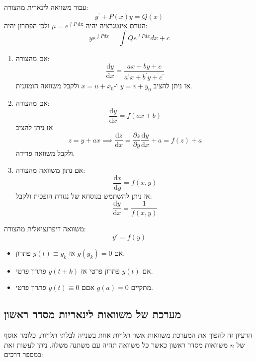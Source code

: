 \documentclass{tstextbook}
\begin{document}
\begin{proposition}
עבור משוואה לינארית מהצורה:
$$y^{\prime}+P(x)y=Q(x)$$
הגורם אינטגרציה יהיה \(\mu=e^{ \int P\;\mathrm{dx} }\) ולכן הפתרון יהיה:
$$y e^{\int P d x}=\int Q e^{\int P d x}d x+c$$

\end{proposition}
\begin{proposition}
  \begin{enumerate}
    \item אם מהצורה: 
$$\frac{\mathrm{d} y}{\mathrm{d} x} ={\frac{a x+b y+c}{a^{\prime}x+b^{\prime}y+c^{\prime}}}$$
אז ניתן להציב \(y=v+y_{0}\) ו-\(x=u+x_{0}\) ולקבל משוואה הומוגנית.


    \item אם מהצורה: 
$$\frac{\mathrm{d} y}{\mathrm{d} x}=f(ax+b)$$
אז ניתן להציב 
$$z=y+ax\implies \frac{\mathrm{d} z}{\mathrm{d} x} =\frac{\partial z}{\partial y} \frac{\mathrm{d} y}{\mathrm{d}x }+a=f(z)+a $$
ולקבל משוואה פרידה.


    \item אם נתון משוואה מהצורה: 
$$\frac{\mathrm{d} x}{\mathrm{d} y} =f(x,y)$$
אז ניתן להשתמש בנוסחא של נגזרת הופכית ולקבל:
$$\frac{\mathrm{d} y}{\mathrm{d} x} = \frac{1}{f(x,y)}$$


  \end{enumerate}
\end{proposition}
\begin{definition}
משוואה דיפרנציאלית מהצורה:
$$y'=f(y)$$

\end{definition}
\begin{proposition}
  \begin{itemize}
    \item אם \(g(y_k)=0\) אז \(y(t)\equiv y_k\) פתרון.
    \item אם \(y(t)\) פתרון פרטי אז \(y(t+k)\) פתרון פרטי.
    \item מתקיים \(g(a)=0\) אםם \(y(t)\equiv 0\) פתרון פרטי.
  \end{itemize}
\end{proposition}
\subsection{מערכת של משוואות לינאריות מסדר ראשון}

הרעיון זה להפוך את המערכת משוואות אשר תלויות אחת בשנייה לבלתי תלויות, כלומר אוסף של \(n\) משוואות מסדר ראשון כאשר כל משוואה תהיה עם משתנה משלה. ניתן לעשות זאת במספר דרכים:
\end{document}
